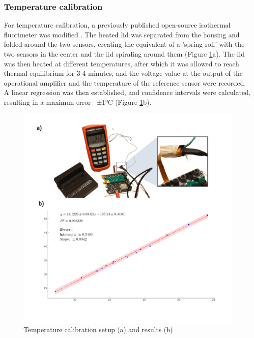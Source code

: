 \documentclass[conference]{IEEEtran}
\begin{document}
      \subsubsection{Temperature calibration}

      For temperature calibration, a previously published open-source isothermal fluorimeter was modified \cite{Open_qLAMPMasterOpen2023}.
      The heated lid was separated from the housing and folded around the two sensors, creating the equivalent of a 'spring roll' with the two sensors 
      in the center and the lid spiraling around them (Figure \ref{fig:temp}a). The lid was then heated at different temperatures, after which it was allowed to reach thermal 
      equilibrium for 3-4 minutes, and the voltage value at the output of the operational amplifier and the temperature of the reference sensor were recorded. 
      A linear regression was then established, and confidence intervals were calculated, resulting in a maximun error ~±1°C (Figure \ref{fig:temp}b).
      
      \begin{figure}[h]
         \centering
         \includegraphics[width=1\linewidth]{images/temp calibration.png}
         \caption{Temperature calibration setup (a) and results (b)}
         \label{fig:temp}
      \end{figure}
\end{document}
